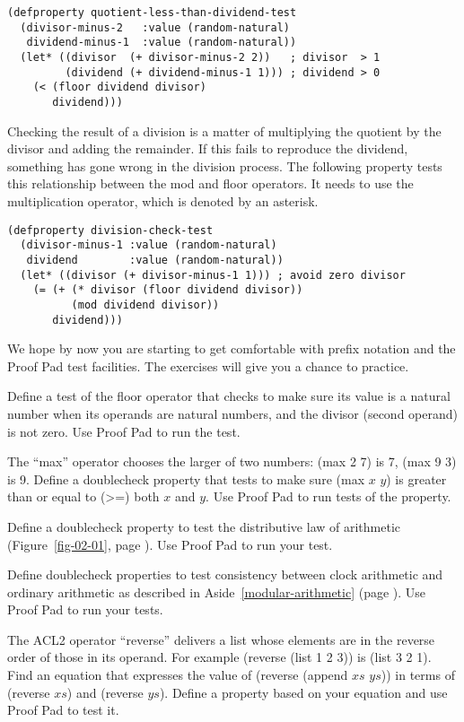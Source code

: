 \label{quotient-less-than-dividend-test}
\begin{Verbatim}
(defproperty quotient-less-than-dividend-test
  (divisor-minus-2   :value (random-natural)
   dividend-minus-1  :value (random-natural))
  (let* ((divisor  (+ divisor-minus-2 2))   ; divisor  > 1
         (dividend (+ dividend-minus-1 1))) ; dividend > 0
    (< (floor dividend divisor)
       dividend)))
\end{Verbatim}

Checking the result of a division is a matter
of multiplying the quotient by the divisor and adding the remainder.
If this fails to reproduce the dividend,
something has gone wrong in the division process.
The following property tests this relationship
between the mod and floor operators.
It needs to use the multiplication operator, which is denoted by an asterisk.

\label{division-check-test}
\begin{Verbatim}
(defproperty division-check-test
  (divisor-minus-1 :value (random-natural)
   dividend        :value (random-natural))
  (let* ((divisor (+ divisor-minus-1 1))) ; avoid zero divisor
    (= (+ (* divisor (floor dividend divisor))
          (mod dividend divisor))
       dividend)))
\end{Verbatim}

We hope by now you are starting to get comfortable with prefix notation
and the Proof Pad test facilities.
The exercises will give you a chance to practice.

\begin{ExerciseList}
\Exercise Define a test of the floor operator
that checks to make sure its value is a natural number
when its operands are natural numbers,
and the divisor (second operand) is not zero.
Use Proof Pad to run the test.

\Exercise The ``max'' operator chooses the larger of two numbers:
(max 2 7) is 7, (max 9 3) is 9.
Define a doublecheck property that tests to make sure
(max $x$ $y$) is greater than or equal to (>=) both $x$ and $y$.
Use Proof Pad to run tests of the property.

\Exercise
Define a doublecheck property to test the distributive law
of arithmetic (Figure~\ref{fig-02-01}, page \pageref{fig-02-01}).
Use Proof Pad to run your test.

\Exercise
Define doublecheck properties to test
consistency between clock
arithmetic and ordinary arithmetic
as described in
Aside~\ref{modular-arithmetic} (page \pageref{modular-arithmetic}).
Use Proof Pad to run your tests.

\Exercise
The ACL2 operator ``reverse'' delivers a list whose
elements are in the reverse order of those in its operand.
For example (reverse (list 1 2 3)) is (list 3 2 1).
Find an equation that expresses the value of (reverse (append $xs$ $ys$))
in terms of (reverse $xs$) and (reverse $ys$).
Define a property based on your equation and
use Proof Pad to test it.

\end{ExerciseList}

